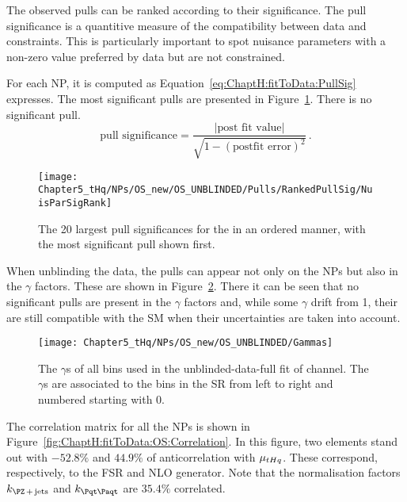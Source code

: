 The observed pulls can be ranked according to their significance. 
The pull significance is a quantitive measure of the compatibility between data and constraints. 
This is particularly important to spot nuisance parameters with a non-zero value preferred by data but are not constrained. 

For each NP, it is computed as Equation~\ref{eq:ChaptH:fitToData:PullSig} expresses.
The most significant pulls are presented in Figure~\ref{fig:ChaptH:fitToData:OS:RankedPull}.
There is no significant pull.
\begin{equation}\label{eq:ChaptH:fitToData:PullSig}
	\text{pull significance}=\frac{|\text{post fit value}|}{\sqrt{1-(\text{postfit error})^{2}}}\, .
\end{equation}

\begin{figure}[h]
\centering
 \texttt{[image: Chapter5\_tHq/NPs/OS\_new/OS\_UNBLINDED/Pulls/RankedPullSig/NuisParSigRank]}
\caption{The 20 largest pull significances for the \dilepOStau in an ordered manner, with the most significant pull shown first.} 
\label{fig:ChaptH:fitToData:OS:RankedPull}
\end{figure}



When unblinding the data, the pulls can appear not only on the NPs but also in the
$\gamma$ factors. These are shown in Figure~\ref{fig:ChaptH:fitToData:OS:Gammas}.
There it can be seen that no significant pulls are present in the $\gamma$ factors and,
while some $\gamma$ drift from 1, their are still compatible with the SM when their
uncertainties are taken into account.
\begin{figure}[h]
\centering
 \texttt{[image: Chapter5\_tHq/NPs/OS\_new/OS\_UNBLINDED/Gammas]}
\caption{The $\gamma$s of all bins used in the unblinded-data-full fit of \dilepOStau channel.
The $\gamma$s are associated to the bins in the SR from left to right
and numbered starting with 0.} 
\label{fig:ChaptH:fitToData:OS:Gammas}
\end{figure}

The correlation matrix for all the NPs is shown in Figure~\ref{fig:ChaptH:fitToData:OS:Correlation}. 
In this figure, two elements stand out with $-52.8\%$ and $44.9\%$ of anticorrelation with $\mu_{tHq}$. These correspond, respectively, to the \ttbar FSR and \ttbar NLO generator. Note that the normalisation factors
$k_{\Zjets}$ and  $k_{\ttbar}$ are $35.4\%$ correlated. 

